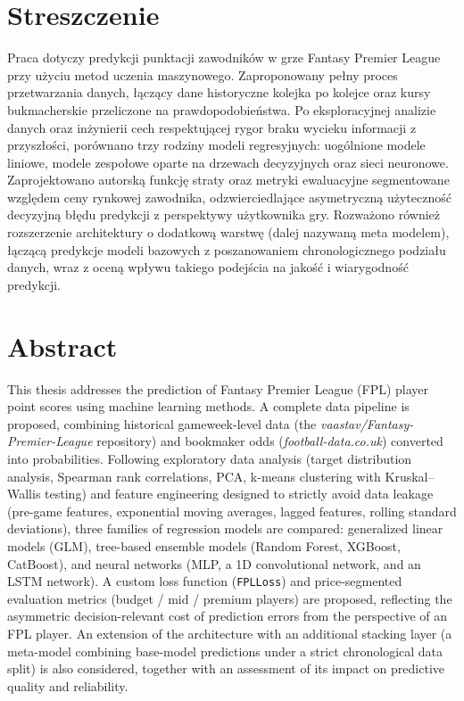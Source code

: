 \documentclass[a4paper,twoside,11pt]{mwrep}
\theoremstyle{plain} \newtheorem{thm}{Twierdzenie}
\theoremstyle{plain} \newtheorem{lem}{Lemat}
\theoremstyle{definition} \newtheorem{defn}{Definicja}
\theoremstyle{remark} \newtheorem*{rem}{Wniosek}
\begin{document}
\chapter*{Streszczenie}
\noindent
Praca dotyczy predykcji punktacji zawodników w grze Fantasy Premier League przy użyciu metod uczenia maszynowego. Zaproponowany pełny proces
przetwarzania danych, łączący dane historyczne kolejka po kolejce oraz kursy bukmacherskie przeliczone na prawdopodobieństwa. Po eksploracyjnej analizie
danych oraz inżynierii cech
respektującej rygor braku wycieku informacji z przyszłości,
porównano trzy rodziny modeli regresyjnych: uogólnione modele liniowe, modele zespołowe oparte na drzewach decyzyjnych oraz sieci neuronowe. Zaprojektowano autorską funkcję straty oraz
metryki ewaluacyjne segmentowane względem ceny rynkowej zawodnika, odzwierciedlające asymetryczną
użyteczność decyzyjną błędu predykcji z perspektywy użytkownika gry.
Rozważono również rozszerzenie architektury o dodatkową warstwę (dalej nazywaną meta modelem), łączącą predykcje modeli bazowych z poszanowaniem chronologicznego podziału danych, wraz z oceną wpływu takiego podejścia na jakość i wiarygodność predykcji.

\clearpage
\thispagestyle{empty}
\chapter*{Abstract}
\noindent
This thesis addresses the prediction of Fantasy Premier League (FPL)
player point scores using machine learning methods. A complete data
pipeline is proposed, combining historical gameweek-level data (the
\emph{vaastav/Fantasy-Premier-League} repository) and bookmaker odds
(\emph{football-data.co.uk}) converted into probabilities. Following exploratory data
analysis (target distribution analysis, Spearman rank correlations,
PCA, k-means clustering with Kruskal--Wallis testing) and feature
engineering designed to strictly avoid data leakage (pre-game features,
exponential moving averages, lagged features, rolling standard
deviations), three families of regression models are compared:
generalized linear models (GLM), tree-based ensemble models (Random
Forest, XGBoost, CatBoost), and neural networks (MLP, a 1D convolutional
network, and an LSTM network). A custom loss function (\texttt{FPLLoss})
and price-segmented evaluation metrics (budget / mid / premium players)
are proposed, reflecting the asymmetric decision-relevant cost of
prediction errors from the perspective of an FPL player. An extension of
the architecture with an additional stacking layer (a meta-model
combining base-model predictions under a strict chronological data
split) is also considered, together with an assessment of its impact on
predictive quality and reliability.
\end{document}
